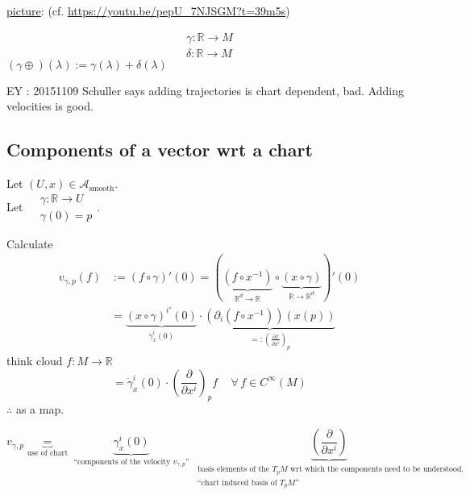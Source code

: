 

\underline{picture}: (cf. \url{https://youtu.be/pepU_7NJSGM?t=39m5s})

\[
\begin{aligned} 
  \gamma : \mathbb{R} \to M \\
  \delta : \mathbb{R} \to M \end{aligned}
\]
$(\gamma \oplus)(\lambda) := \gamma(\lambda) + \delta(\lambda)$

EY : 20151109 Schuller says adding trajectories is chart dependent, bad. Adding velocities is good.  
\subsection{Components of a vector wrt a chart}

\begin{definition}
  Let $(U,x) \in \mathcal{A}_{\text{smooth}}$.  \\
  Let $\begin{aligned} & \gamma : \mathbb{R} \to U \\ 
    & \gamma(0) = p \end{aligned}$.  

Calculate 
\[
\begin{aligned} 
  v_{\gamma,p}(f) & := (f \circ \gamma)'(0) = (\underbrace{ (f\circ x^{-1}) }_{\mathbb{R}^d \to \mathbb{R} }  \circ \underbrace{ (x\circ \gamma)}_{\mathbb{R} \to \mathbb{R}^d}  )'(0) \\
  & = \underbrace{ (x\circ \gamma)^{i'}(0) }_{\dot{\gamma}_x^i(0) }  \cdot \underbrace{ (\partial_i(f\circ x^{-1} ) )(x(p))  }_{ =: \left( \frac{ \partial f}{ \partial x^i } \right)_p }
\end{aligned}
\]
think cloud $f:M\to \mathbb{R}$
\[
 = \boxed{ \dot{\gamma}_x^i(0) \cdot \left( \frac{ \partial }{ \partial x^i} \right)_p } f \quad \, \forall \, f \in C^{\infty}(M)
\]
$\therefore$ as a map.  

\[
v_{\gamma,p} \underbrace{=}_{\text{use of chart} } \underbrace{ \gamma_x^i(0) }_{ \text{ ``components of the velocity $v_{\gamma,p}$'' } } \underbrace{ \left( \frac{ \partial }{ \partial x^i} \right)}_{ \substack{ \text{ basis elements of the $T_pM$ wrt which the components need to be understood.} \\
\text{ ``chart induced basis of $T_pM$''} } } 
\]
\end{definition}

